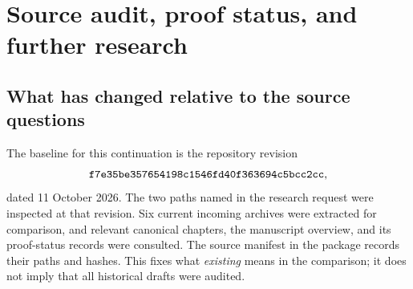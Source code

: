 \section{Source audit, proof status, and further research}
\label{audit:section}

\subsection{What has changed relative to the source questions}

The baseline for this continuation is the repository revision
\[
\texttt{f7e35be357654198c1546fd40f363694c5bcc2cc},
\]
dated 11 October 2026. The two paths named
in the research request were inspected at that revision. Six current
incoming archives were extracted for comparison, and relevant canonical
chapters, the manuscript overview, and its proof-status records were
consulted. The source manifest in the package records their paths and
hashes. This fixes what \emph{existing} means in the comparison; it does
not imply that all historical drafts were audited.

